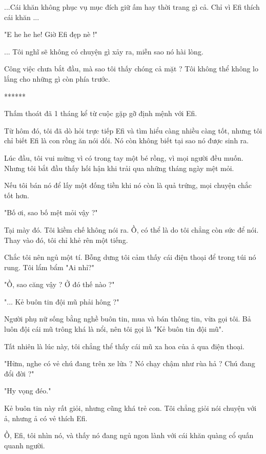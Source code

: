 ...Cái khăn không phục vụ mục đích giữ ấm hay thời trang gì cả. Chỉ vì Efi thích cái khăn ... 

"E he he he! Giờ Efi đẹp nè !"

... Tôi nghĩ sẽ không có chuyện gì xảy ra, miễn sao nó hài lòng.

Công việc chưa bắt đầu, mà sao tôi thấy chóng cả mặt ? Tôi không thể không lo lắng cho những gì còn phía trước.  
\begin{center}
	******
\end{center}

Thấm thoát đã 1 tháng kể từ cuộc gặp gỡ định mệnh với Efi. 

Từ hôm đó, tôi đã dò hỏi trực tiếp Efi và tìm hiểu càng nhiều càng tốt, nhưng tôi chỉ biết Efi là con rồng ăn nói dối. Nó còn không biết tại sao nó được sinh ra. 

Lúc đầu, tôi vui mừng vì có trong tay một bé rồng, vì mọi người đều muốn. Nhưng tôi bắt đầu thấy hối hận khi trải qua những tháng ngày mệt mỏi.

Nếu tôi bán nó để lấy một đống tiền khi nó còn là quả trứng, mọi chuyện chắc tốt hơn. 

"Bố ơi, sao bố mệt mỏi vậy ?"

Tại mày đó. Tôi kiềm chế không nói ra. Ồ, có thể là do tôi chẳng còn sức để nói. Thay vào đó, tôi chỉ khẻ rên một tiếng.

Chắc tôi nên ngủ một tí. Bỗng dưng tôi cảm thấy cái điện thoại để trong túi nó rung. Tôi lẩm bẩm "Ai nhỉ?"

"Ồ, sao căng vậy ? Ở đó thế nào ?"

"... Kẻ buôn tin đội mũ phải hông ?"

Người phụ nữ sống bằng nghề buôn tin, mua và bán thông tin, vừa gọi tôi. Bả luôn đội cái mũ trông khá là nổi, nên tôi gọi là "Kẻ buôn tin đội mũ".

Tất nhiên là lúc này, tôi chẳng thể thấy cái mũ xa hoa của ả qua điện thoại. 

"Hừm, nghe có vẻ chú đang trên xe lửa ? Nó chạy chậm như rùa hả ? Chú đang đổi đời ?"

"Hy vọng đéo."

Kẻ buôn tin này rất giỏi, nhưng cũng khá trẻ con. Tôi chẳng giỏi nói chuyện với ả, nhưng ả có vẻ thích Efi. 

Ồ, Efi, tôi nhìn nó, và thấy nó đang ngủ ngon lành với cái khăn quàng cổ quấn quanh người. 

